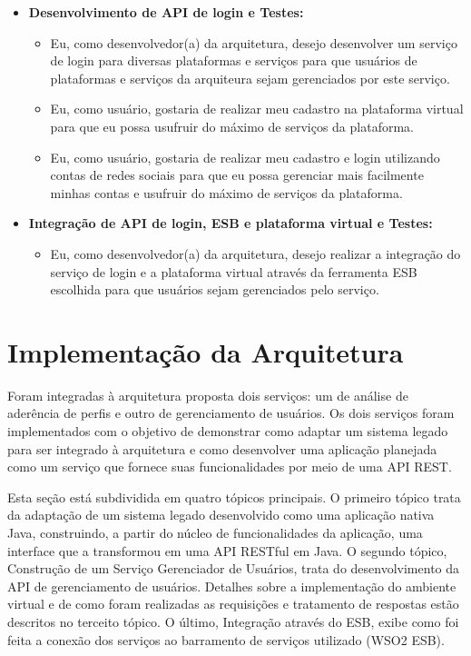 \begin{itemize}
\item \textbf{Desenvolvimento de API de login e Testes:} 
\begin{itemize}
\item Eu, como desenvolvedor(a) da arquitetura, desejo desenvolver um serviço de login para diversas plataformas e serviços para que usuários de plataformas e serviços da arquiteura sejam gerenciados por este serviço.
\item Eu, como usuário, gostaria de realizar meu cadastro na plataforma virtual para que eu possa usufruir do máximo de serviços da plataforma.
\item Eu, como usuário, gostaria de realizar meu cadastro e login utilizando contas de redes sociais para que eu possa gerenciar mais facilmente minhas contas e usufruir do máximo de serviços da plataforma.
\end{itemize}

\item \textbf{Integração de API de login, ESB e plataforma virtual e Testes:} 
\begin{itemize}
\item Eu, como desenvolvedor(a) da arquitetura, desejo realizar a integração do serviço de login e a plataforma virtual através da ferramenta ESB escolhida para que usuários sejam gerenciados pelo serviço.
\end{itemize}

\end{itemize}

\section{Implementação da Arquitetura}
Foram integradas à arquitetura proposta dois serviços: um de análise de aderência de perfis e outro de gerenciamento de usuários. Os dois serviços foram implementados com o objetivo de demonstrar como adaptar um sistema legado para ser integrado à arquitetura e como desenvolver uma aplicação planejada como um serviço que fornece suas funcionalidades por meio de uma API REST.

Esta seção está subdividida em quatro tópicos principais. O primeiro tópico trata da adaptação de um sistema legado desenvolvido como uma aplicação nativa Java, construindo, a partir do núcleo de funcionalidades da aplicação, uma interface que a transformou em uma API RESTful em Java. O segundo tópico, Construção de um Serviço Gerenciador de Usuários, trata do desenvolvimento da API de gerenciamento de usuários. Detalhes sobre a implementação do ambiente virtual e de como foram realizadas as requisições e tratamento de respostas estão descritos no terceito tópico. O último, Integração através do ESB, exibe como foi feita a conexão dos serviços ao barramento de serviços utilizado (WSO2 ESB).

